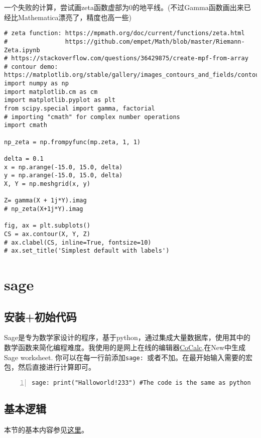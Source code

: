 \documentclass[11pt]{amsart}
\begin{document}
\begin{lstlisting}[language=iPython]
\end{lstlisting}

一个失败的计算，尝试画zeta函数虚部为0的地平线。(不过Gamma函数画出来已经比Mathematica漂亮了，精度也高一些)
\begin{lstlisting}[language=iPython]
# zeta function: https://mpmath.org/doc/current/functions/zeta.html
#                https://github.com/empet/Math/blob/master/Riemann-Zeta.ipynb
# https://stackoverflow.com/questions/36429875/create-mpf-from-array
# contour demo: https://matplotlib.org/stable/gallery/images_contours_and_fields/contour_demo.html
import numpy as np
import matplotlib.cm as cm
import matplotlib.pyplot as plt
from scipy.special import gamma, factorial
# importing "cmath" for complex number operations
import cmath

np_zeta = np.frompyfunc(mp.zeta, 1, 1)

delta = 0.1
x = np.arange(-15.0, 15.0, delta)
y = np.arange(-15.0, 15.0, delta)
X, Y = np.meshgrid(x, y)

Z= gamma(X + 1j*Y).imag 
# np_zeta(X+1j*Y).imag

fig, ax = plt.subplots()
CS = ax.contour(X, Y, Z)
# ax.clabel(CS, inline=True, fontsize=10)
# ax.set_title('Simplest default with labels')
\end{lstlisting}

\section{sage}
\subsection{安装+初始代码}
Sage是专为数学家设计的程序，基于python，通过集成大量数据库，使用其中的数学函数来简化编程难度。我使用的是网上在线的编辑器\href{https://cocalc.com/projects}{CoCalc},在New中生成Sage worksheet.
你可以在每一行前添加\lstinline|sage: |或者不加。在最开始输入需要的宏包，然后直接进行计算即可。

\begin{lstlisting}[numbers=left,numberstyle=\tiny,numbersep=10pt]
sage: print("Halloworld!233") #The code is the same as python
\end{lstlisting}
\subsection{基本逻辑}
本节的基本内容参见\href{https://www.osgeo.cn/sagemath/thematic_tutorials/tutorial-programming-python.html#tutorial-programming-python}{这里}。
\end{document}
